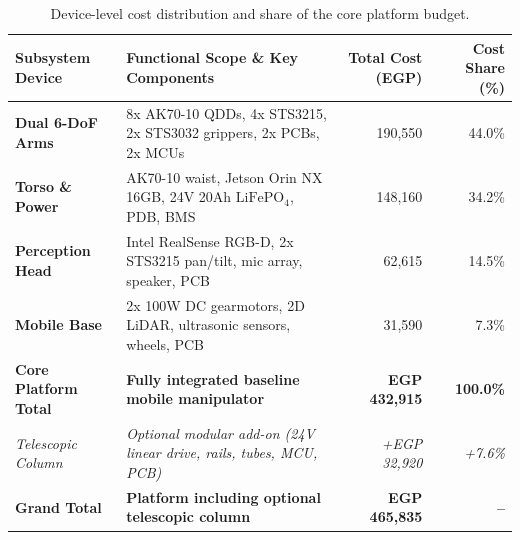 \begin{table}[htbp]
\centering\small
\caption{Device-level cost distribution and share of the core platform budget.}
\label{tab:subsystem_costs}
\begin{tabularx}{\textwidth}{@{}l Y r r@{}}
\toprule
\textbf{Subsystem Device} & \textbf{Functional Scope \& Key Components} & \textbf{Total Cost (EGP)} & \textbf{Cost Share (\%)} \\
\midrule
\textbf{Dual 6-DoF Arms} & 8x AK70-10 QDDs, 4x STS3215, 2x STS3032 grippers, 2x PCBs, 2x MCUs & 190,550 & 44.0\% \\
\textbf{Torso \& Power} & AK70-10 waist, Jetson Orin NX 16GB, 24V 20Ah $\text{LiFePO}_4$, PDB, BMS & 148,160 & 34.2\% \\
\textbf{Perception Head} & Intel RealSense RGB-D, 2x STS3215 pan/tilt, mic array, speaker, PCB & 62,615 & 14.5\% \\
\textbf{Mobile Base} & 2x 100W DC gearmotors, 2D LiDAR, ultrasonic sensors, wheels, PCB & 31,590 & 7.3\% \\
\midrule
\textbf{Core Platform Total} & \textbf{Fully integrated baseline mobile manipulator} & \textbf{EGP 432,915} & \textbf{100.0\%} \\
\midrule
\emph{Telescopic Column} & \emph{Optional modular add-on (24V linear drive, rails, tubes, MCU, PCB)} & \emph{+EGP 32,920} & \emph{+7.6\%} \\
\midrule
\textbf{Grand Total} & \textbf{Platform including optional telescopic column} & \textbf{EGP 465,835} & \textbf{--} \\
\bottomrule
\end{tabularx}
\end{table}

